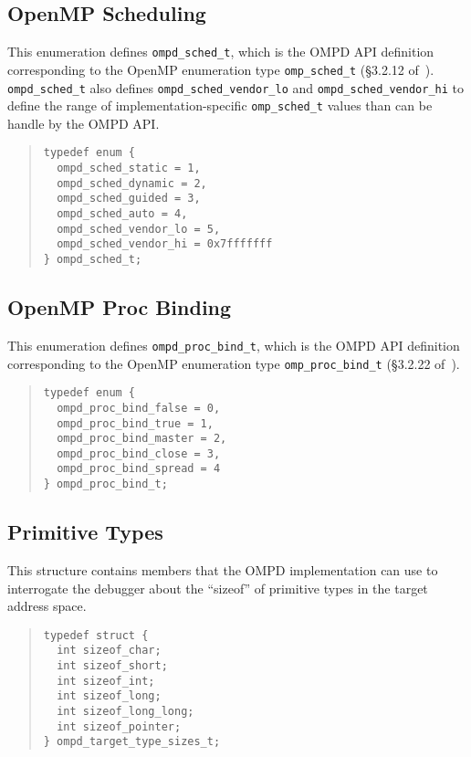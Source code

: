 %
\subsection{OpenMP Scheduling}
%
This enumeration defines \verb|ompd_sched_t|, which is the OMPD API
definition corresponding to the OpenMP enumeration type
\verb|omp_sched_t| (\S3.2.12 of~\cite{OpenMP}).
%
\verb|ompd_sched_t| also defines \verb|ompd_sched_vendor_lo| and
\verb|ompd_sched_vendor_hi| to define the range of
implementation-specific \verb|omp_sched_t| values than can be handle
by the OMPD API.
%
\begin{quote}
\begin{lstlisting}
typedef enum {
  ompd_sched_static = 1,
  ompd_sched_dynamic = 2,
  ompd_sched_guided = 3,
  ompd_sched_auto = 4,
  ompd_sched_vendor_lo = 5,
  ompd_sched_vendor_hi = 0x7fffffff
} ompd_sched_t;
\end{lstlisting}
\end{quote}

%
\subsection{OpenMP Proc Binding}
%
This enumeration defines \verb|ompd_proc_bind_t|, which is the OMPD
API definition corresponding to the OpenMP enumeration type
\verb|omp_proc_bind_t| (\S3.2.22 of~\cite{OpenMP}).
%
\begin{quote}
\begin{lstlisting}
typedef enum {
  ompd_proc_bind_false = 0,
  ompd_proc_bind_true = 1,
  ompd_proc_bind_master = 2,
  ompd_proc_bind_close = 3,
  ompd_proc_bind_spread = 4
} ompd_proc_bind_t;
\end{lstlisting}
\end{quote}

%
\subsection{Primitive Types}
%
This structure contains members that the OMPD implementation can use
to interrogate the debugger about the ``sizeof'' of primitive types in
the target address space.
%
\begin{quote}
\begin{lstlisting}
typedef struct {
  int sizeof_char;
  int sizeof_short;
  int sizeof_int;
  int sizeof_long;
  int sizeof_long_long;
  int sizeof_pointer;
} ompd_target_type_sizes_t;
\end{lstlisting}
\end{quote}

